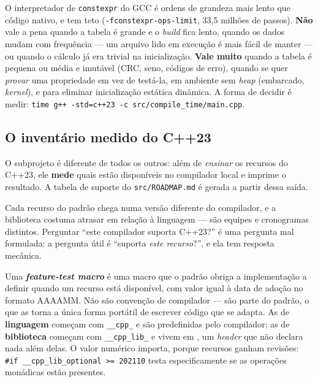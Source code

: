 \begin{regra}
O interpretador de \texttt{constexpr} do GCC é ordens de grandeza mais lento que
código nativo, e tem teto (\texttt{-fconstexpr-ops-limit}, 33,5 milhões de
passos). \textbf{Não} vale a pena quando a tabela é grande e o \emph{build} fica
lento, quando os dados mudam com frequência --- um arquivo lido em execução é
mais fácil de manter --- ou quando o cálculo já era trivial na inicialização.
\textbf{Vale muito} quando a tabela é pequena ou média e imutável (CRC, seno,
códigos de erro), quando se quer \emph{provar} uma propriedade em vez de
testá-la, em ambiente sem \emph{heap} (embarcado, \emph{kernel}), e para
eliminar inicialização estática dinâmica. A forma de decidir é medir:
\texttt{time g++ -std=c++23 -c src/compile\_time/main.cpp}.
\end{regra}

\subsection{O inventário medido do C++23}
\label{sec:cpp23-medido}

O subprojeto  é diferente de todos os outros: além de
\emph{ensinar} os recursos do C++23, ele \textbf{mede} quais estão disponíveis
no compilador local e imprime o resultado. A tabela de suporte do
\texttt{src/ROADMAP.md} é gerada a partir dessa saída.

\begin{porque}
Cada recurso do padrão chega numa versão diferente do compilador, e a biblioteca
costuma atrasar em relação à linguagem --- são equipes e cronogramas distintos.
Perguntar ``este compilador suporta C++23?'' é uma pergunta mal formulada: a
pergunta útil é ``suporta \emph{este recurso}?'', e ela tem resposta mecânica.
\end{porque}

Uma \textbf{\emph{feature-test macro}} é uma macro que o padrão obriga a
implementação a definir quando um recurso está disponível, com valor igual à
data de adoção no formato AAAAMM. Não são convenção de compilador --- são parte
do padrão, o que as torna a única forma portátil de escrever código que se
adapta. As de \textbf{linguagem} começam com \texttt{\_\_cpp\_} e são
predefinidas pelo compilador; as de \textbf{biblioteca} começam com
\texttt{\_\_cpp\_lib\_} e vivem em , um \emph{header} que não
declara nada além delas. O valor numérico importa, porque recursos ganham
revisões: \texttt{\#if \_\_cpp\_lib\_optional >= 202110} testa especificamente
se as operações monádicas estão presentes.

